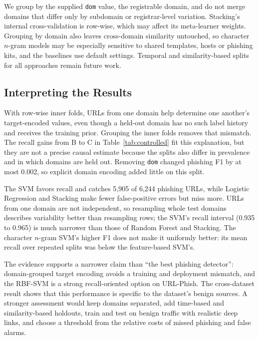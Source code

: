 \documentclass[conference]{IEEEtran}
\begin{document}
We group by the supplied \texttt{dom} value, the registrable domain, and do not merge domains that differ only by subdomain or registrar-level variation. Stacking's internal cross-validation is row-wise, which may affect its meta-learner weights. Grouping by domain also leaves cross-domain similarity untouched, so character $n$-gram models may be especially sensitive to shared templates, hosts or phishing kits, and the baselines use default settings. Temporal and similarity-based splits for all approaches remain future work.

\subsection{Interpreting the Results}
With row-wise inner folds, URLs from one domain help determine one another's target-encoded values, even though a held-out domain has no such label history and receives the training prior. Grouping the inner folds removes that mismatch. The recall gains from B to C in Table~\ref{tab:controlled} fit this explanation, but they are not a precise causal estimate because the splits also differ in prevalence and in which domains are held out. Removing \texttt{dom} changed phishing F1 by at most 0.002, so explicit domain encoding added little on this split.

The SVM favors recall and catches 5{,}905 of 6{,}244 phishing URLs, while Logistic Regression and Stacking make fewer false-positive errors but miss more. URLs from one domain are not independent, so resampling whole test domains describes variability better than resampling rows; the SVM's recall interval (0.935 to 0.965) is much narrower than those of Random Forest and Stacking. The character $n$-gram SVM's higher F1 does not make it uniformly better: its mean recall over repeated splits was below the feature-based SVM's.

The evidence supports a narrower claim than ``the best phishing detector'': domain-grouped target encoding avoids a training and deployment mismatch, and the RBF-SVM is a strong recall-oriented option on URL-Phish. The cross-dataset result shows that this performance is specific to the dataset's benign sources. A stronger assessment would keep domains separated, add time-based and similarity-based holdouts, train and test on benign traffic with realistic deep links, and choose a threshold from the relative costs of missed phishing and false alarms.
\end{document}
